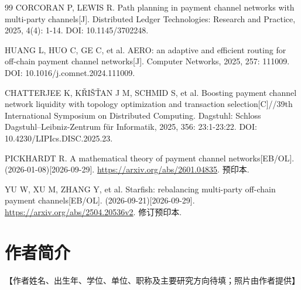 \documentclass[UTF8,a4paper,twocolumn,fontset=none,zihao=5]{ctexart}
\begin{document}
\begin{thebibliography}{99}
 CORCORAN P, LEWIS R. Path planning in payment channel networks with multi-party channels[J]. Distributed Ledger Technologies: Research and Practice, 2025, 4(4): 1-14. DOI: 10.1145/3702248.

 HUANG L, HUO C, GE C, et al. AERO: an adaptive and efficient routing for off-chain payment channel networks[J]. Computer Networks, 2025, 257: 111009. DOI: 10.1016/j.comnet.2024.111009.

 CHATTERJEE K, KŘIŠŤAN J M, SCHMID S, et al. Boosting payment channel network liquidity with topology optimization and transaction selection[C]//39th International Symposium on Distributed Computing. Dagstuhl: Schloss Dagstuhl–Leibniz-Zentrum für Informatik, 2025, 356: 23:1-23:22. DOI: 10.4230/LIPIcs.DISC.2025.23.

 PICKHARDT R. A mathematical theory of payment channel networks[EB/OL]. (2026-01-08)[2026-09-29]. \url{https://arxiv.org/abs/2601.04835}. 预印本.

 YU W, XU M, ZHANG Y, et al. Starfish: rebalancing multi-party off-chain payment channels[EB/OL]. (2026-09-21)[2026-09-29]. \url{https://arxiv.org/abs/2504.20536v2}. 修订预印本.

\end{thebibliography}\section*{作者简介}

【作者姓名、出生年、学位、单位、职称及主要研究方向待填；照片由作者提供】
\end{document}

